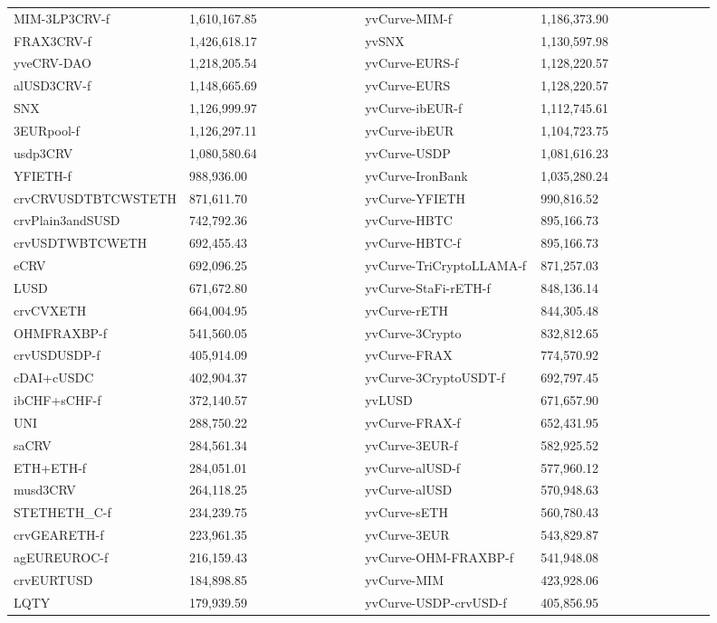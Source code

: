 \begin{longtable}{@{}p{0.25\linewidth}p{0.25\linewidth}p{0.25\linewidth}p{0.25\linewidth}@{}}
MIM-3LP3CRV-f & 1,610,167.85 & yvCurve-MIM-f & 1,186,373.90 \\
FRAX3CRV-f & 1,426,618.17 & yvSNX & 1,130,597.98 \\
yveCRV-DAO & 1,218,205.54 & yvCurve-EURS-f & 1,128,220.57 \\
alUSD3CRV-f & 1,148,665.69 & yvCurve-EURS & 1,128,220.57 \\
SNX & 1,126,999.97 & yvCurve-ibEUR-f & 1,112,745.61 \\
3EURpool-f & 1,126,297.11 & yvCurve-ibEUR & 1,104,723.75 \\
usdp3CRV & 1,080,580.64 & yvCurve-USDP & 1,081,616.23 \\
YFIETH-f & 988,936.00 & yvCurve-IronBank & 1,035,280.24 \\
crvCRVUSDTBTCWSTETH & 871,611.70 & yvCurve-YFIETH & 990,816.52 \\
crvPlain3andSUSD & 742,792.36 & yvCurve-HBTC & 895,166.73 \\
crvUSDTWBTCWETH & 692,455.43 & yvCurve-HBTC-f & 895,166.73 \\
eCRV & 692,096.25 & yvCurve-TriCryptoLLAMA-f & 871,257.03 \\
LUSD & 671,672.80 & yvCurve-StaFi-rETH-f & 848,136.14 \\
crvCVXETH & 664,004.95 & yvCurve-rETH & 844,305.48 \\
OHMFRAXBP-f & 541,560.05 & yvCurve-3Crypto & 832,812.65 \\
crvUSDUSDP-f & 405,914.09 & yvCurve-FRAX & 774,570.92 \\
cDAI+cUSDC & 402,904.37 & yvCurve-3CryptoUSDT-f & 692,797.45 \\
ibCHF+sCHF-f & 372,140.57 & yvLUSD & 671,657.90 \\
UNI & 288,750.22 & yvCurve-FRAX-f & 652,431.95 \\
saCRV & 284,561.34 & yvCurve-3EUR-f & 582,925.52 \\
ETH+ETH-f & 284,051.01 & yvCurve-alUSD-f & 577,960.12 \\
musd3CRV & 264,118.25 & yvCurve-alUSD & 570,948.63 \\
STETHETH_C-f & 234,239.75 & yvCurve-sETH & 560,780.43 \\
crvGEARETH-f & 223,961.35 & yvCurve-3EUR & 543,829.87 \\
agEUREUROC-f & 216,159.43 & yvCurve-OHM-FRAXBP-f & 541,948.08 \\
crvEURTUSD & 184,898.85 & yvCurve-MIM & 423,928.06 \\
LQTY & 179,939.59 & yvCurve-USDP-crvUSD-f & 405,856.95 \\

\end{longtable}
